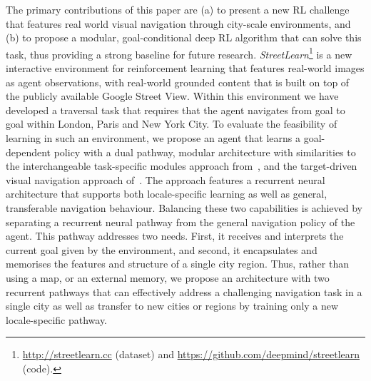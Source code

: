 The primary contributions of this paper are (a) to present a new RL challenge that features real world visual navigation through city-scale environments, and (b) to propose a modular, goal-conditional deep RL algorithm that can solve this task, thus providing a strong baseline for future research.
\emph{StreetLearn}\footnote{\url{http://streetlearn.cc} (dataset) and \url{https://github.com/deepmind/streetlearn} (code).}%
%
is a new interactive environment for reinforcement learning that features real-world images as agent observations, with real-world grounded content that is built on top of the publicly available Google Street View. Within this environment we have developed a traversal task that requires that the agent navigates from goal to goal within London, Paris and New York City. 
To evaluate the feasibility of learning in such an environment, we propose an agent that learns a goal-dependent policy with a dual pathway, modular architecture with similarities to the interchangeable task-specific modules approach from~\cite{devin2017learning}, and the target-driven visual navigation approach of~\cite{zhu_icra2017}. The approach features a recurrent neural architecture that supports both locale-specific learning as well as general, transferable navigation behaviour. Balancing these two capabilities is achieved by separating a recurrent neural pathway from the general navigation policy of the agent. This pathway  addresses two needs. First, it receives and interprets the current goal given by the environment, and second, it encapsulates and memorises the features and structure of a single city region. Thus, rather than using a map, or an external memory, we propose an architecture with two recurrent pathways that can effectively address a challenging navigation task in a single city as well as transfer to new cities or regions by training only a new locale-specific pathway.
